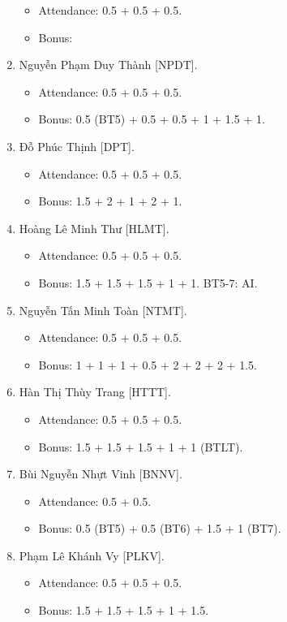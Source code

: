 \documentclass{article}
\begin{document}
\begin{enumerate}
\begin{itemize}
        \item Attendance: 0.5 + 0.5 + 0.5.
        \item Bonus:
    \end{itemize}
    \item {\sc Nguyễn Phạm Duy Thành [NPDT].}
    \begin{itemize}
        \item Attendance: 0.5 + 0.5 + 0.5.
        \item Bonus: 0.5 (BT5) + 0.5 + 0.5 + 1 + 1.5 + 1.
    \end{itemize}
    \item {\sc Đỗ Phúc Thịnh [DPT].}
    \begin{itemize}
        \item Attendance: 0.5 + 0.5 + 0.5.
        \item Bonus: 1.5 + 2 + 1 + 2 + 1.
    \end{itemize}
    \item {\sc Hoàng Lê Minh Thư [HLMT].}
    \begin{itemize}
        \item Attendance: 0.5 + 0.5 + 0.5.
        \item Bonus: 1.5 + 1.5 + 1.5 + 1 + 1. BT5-7: AI.
    \end{itemize}
    \item {\sc Nguyễn Tấn Minh Toàn [NTMT].}
    \begin{itemize}
        \item Attendance: 0.5 + 0.5 + 0.5.
        \item Bonus: 1 + 1 + 1 + 0.5 + 2 + 2 + 2 + 1.5.
    \end{itemize}
    \item {\sc Hàn Thị Thùy Trang [HTTT].}
    \begin{itemize}
        \item Attendance: 0.5 + 0.5 + 0.5.
        \item Bonus: 1.5 + 1.5 + 1.5 + 1 + 1 (BTLT).
    \end{itemize}
    \item {\sc Bùi Nguyễn Nhựt Vinh [BNNV].}
    \begin{itemize}
        \item Attendance: 0.5 + 0.5.
        \item Bonus: 0.5 (BT5) + 0.5 (BT6) + 1.5 + 1 (BT7).
    \end{itemize}
    \item {\sc Phạm Lê Khánh Vy [PLKV].}
    \begin{itemize}
        \item Attendance: 0.5 + 0.5 + 0.5.
        \item Bonus: 1.5 + 1.5 + 1.5 + 1 + 1.5.
    \end{itemize}
\end{enumerate}
\end{document}
